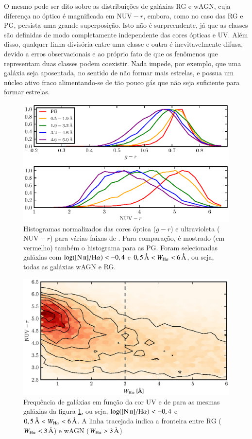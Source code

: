 O mesmo pode ser dito sobre as distribuições de galáxias RG e wAGN, cuja
diferença no óptico é magnificada em $\mathrm{NUV}-r$, embora, como no caso das
RG e PG, persista uma grande superposição. Isto não é surpreendente, já que as
classes são definidas de modo completamente independente das cores ópticas e UV.
Além disso, qualquer linha divisória entre uma classe e outra é inevitavelmente
difusa, devido a erros observacionais e ao próprio fato de que os fenômenos que
representam duas classes podem coexistir. Nada impede, por exemplo, que uma
galáxia seja aposentada, no sentido de não formar mais estrelas, e possua um
núcleo ativo fraco alimentando-se de tão pouco gás que não seja suficiente para
formar estrelas.

\begin{figure}
	\includegraphics{figuras/histo_wha_color.eps}
	\caption[Histogramas de cores em função de \WHa.]
	{Histogramas normalizados das cores óptica ($g-r$) e ultravioleta
	($\mathrm{NUV}-r$) para várias faixas de \WHa. Para comparação, é mostrado (em
	vermelho) também o histograma para as PG. Foram selecionadas galáxias com
	$\log(\nII/\Halpha) < -0,4$ e $0,5\,\text{\AA} < \WHa < 6\,\text{\AA}$, ou
	seja, todas as galáxias wAGN e RG.}
	\label{fig:HistogramaCorWHa}
\end{figure}

\begin{figure}
	\includegraphics{figuras/wha_nuv.eps}
	\caption[Cor UV em função de \WHa.]
	{Frequência de galáxias em função da cor UV e de \WHa para as mesmas
	galáxias da figura \ref{fig:HistogramaCorWHa}, ou seja, $\log(\nII/\Halpha) <
	-0,4$ e $0,5\,\text{\AA} < \WHa < 6\,\text{\AA}$. A linha tracejada indica a
	fronteira entre RG ($\WHa < 3\,\text{\AA}$) e wAGN ($\WHa > 3\,\text{\AA}$)}
	\label{fig:ColorWha}
\end{figure}

